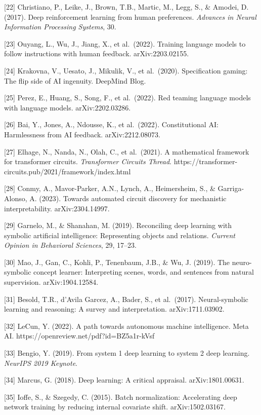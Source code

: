 \documentclass[
  11pt,
  letterpaper,
]{article}
\begin{document}
{[}22{]} Christiano, P., Leike, J., Brown, T.B., Martic, M., Legg, S.,
\& Amodei, D. (2017). Deep reinforcement learning from human
preferences. \emph{Advances in Neural Information Processing Systems},
30.

{[}23{]} Ouyang, L., Wu, J., Jiang, X., et al.~(2022). Training language
models to follow instructions with human feedback. arXiv:2203.02155.

{[}24{]} Krakovna, V., Uesato, J., Mikulik, V., et al.~(2020).
Specification gaming: The flip side of AI ingenuity. DeepMind Blog.

{[}25{]} Perez, E., Huang, S., Song, F., et al.~(2022). Red teaming
language models with language models. arXiv:2202.03286.

{[}26{]} Bai, Y., Jones, A., Ndousse, K., et al.~(2022). Constitutional
AI: Harmlessness from AI feedback. arXiv:2212.08073.

{[}27{]} Elhage, N., Nanda, N., Olah, C., et al.~(2021). A mathematical
framework for transformer circuits. \emph{Transformer Circuits Thread}.
https://transformer-circuits.pub/2021/framework/index.html

{[}28{]} Conmy, A., Mavor-Parker, A.N., Lynch, A., Heimersheim, S., \&
Garriga-Alonso, A. (2023). Towards automated circuit discovery for
mechanistic interpretability. arXiv:2304.14997.

{[}29{]} Garnelo, M., \& Shanahan, M. (2019). Reconciling deep learning
with symbolic artificial intelligence: Representing objects and
relations. \emph{Current Opinion in Behavioral Sciences}, 29, 17--23.

{[}30{]} Mao, J., Gan, C., Kohli, P., Tenenbaum, J.B., \& Wu, J. (2019).
The neuro-symbolic concept learner: Interpreting scenes, words, and
sentences from natural supervision. arXiv:1904.12584.

{[}31{]} Besold, T.R., d'Avila Garcez, A., Bader, S., et al.~(2017).
Neural-symbolic learning and reasoning: A survey and interpretation.
arXiv:1711.03902.

{[}32{]} LeCun, Y. (2022). A path towards autonomous machine
intelligence. Meta AI. https://openreview.net/pdf?id=BZ5a1r-kVsf

{[}33{]} Bengio, Y. (2019). From system 1 deep learning to system 2 deep
learning. \emph{NeurIPS 2019 Keynote}.

{[}34{]} Marcus, G. (2018). Deep learning: A critical appraisal.
arXiv:1801.00631.

{[}35{]} Ioffe, S., \& Szegedy, C. (2015). Batch normalization:
Accelerating deep network training by reducing internal covariate shift.
arXiv:1502.03167.
\end{document}
